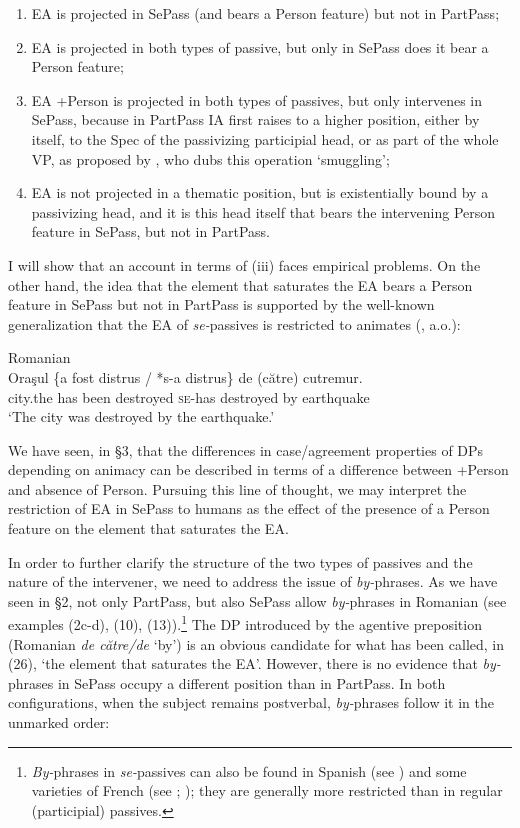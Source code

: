 \documentclass[output=paper]{langsci/langscibook}
\begin{document}
\begin{enumerate}[label=(\roman*)]
\item EA is projected in SePass (and bears a Person feature) but not in PartPass; 
\item EA is projected in both types of passive, but only in SePass does it bear a Person feature;
\item EA +Person is projected in both types of passives, but only intervenes in SePass, because in PartPass IA first raises to a higher position, either by itself, to the Spec of the passivizing participial head, or as part of the whole VP, as proposed by \citet{Collins2005}, who dubs this operation ‘smuggling'; 
\item EA is not projected in a thematic position, but is existentially bound by a passivizing head, and it is this head itself that bears the intervening Person feature in SePass, but not in PartPass.
\end{enumerate} 


  I will show that an account in terms of (iii) faces empirical problems. On the other hand, the idea that the element that saturates the EA bears a Person feature in SePass but not in PartPass is supported by the well-known generalization that the EA of \textit{se-}passives is restricted to animates (\citealt{Burzio1994,Cornilescu1998,Dobrovie-Sorin2017,Zribi-Hertz2008}, a.o.):

\ea%
         Romanian   \label{ex:giurgea:28}\\
    \gll Oraşul \{a    fost  distrus      / *s-a      distrus\}   {de (către)} cutremur.\\
         city.the  has been destroyed  {}  \textsc{se-}has destroyed by            earthquake\\
    \glt ‘The city was destroyed by the earthquake.’
    \z

          

We have seen, in §3, that the differences in case\slash agreement properties of DPs depending on animacy can be described in terms of a difference between +Person and absence of Person. Pursuing this line of thought, we may interpret the restriction of EA in SePass to humans as the effect of the presence of a Person feature on the element that saturates the EA.

  In order to further clarify the structure of the two types of passives and the nature of the intervener, we need to address the issue of \textit{by-}phrases. As we have seen in §2, not only PartPass, but also SePass allow \textit{by-}phrases in Romanian (see examples (2c-d), (10), (13)).\footnote{\textit{By-}phrases in \textit{se-}passives can also be found in Spanish (see \citealt{MacDonald2017}) and some varieties of French (see \citealt{Authier1996}; \citealt{Zribi-Hertz2008}); they are generally more restricted than in regular (participial) passives.}  The DP introduced by the agentive preposition (Romanian \textit{de către\slash de} ‘by’) is an obvious candidate for what has been called, in (26), ‘the element that saturates the EA’. However, there is no evidence that \textit{by-}phrases in SePass occupy a different position than in PartPass. In both configurations, when the subject remains postverbal, \textit{by-}phrases follow it in the unmarked order: 
\end{document}
